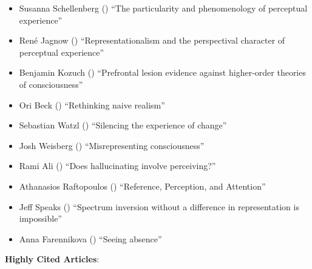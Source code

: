\documentclass[
  10pt,
  letterpaper,
  DIV=11,
  numbers=noendperiod,
  twoside]{scrartcl}
\providecommand{\tightlist}{%
  \setlength{\itemsep}{0pt}\setlength{\parskip}{0pt}}\usepackage{longtable,booktabs,array}
\begin{document}
\begin{itemize}
\tightlist
\item
  Susanna Schellenberg () ``The
  particularity and phenomenology of perceptual experience''
\item
  René Jagnow ()
  ``Representationalism and the perspectival character of perceptual
  experience''
\item
  Benjamin Kozuch () ``Prefrontal
  lesion evidence against higher-order theories of consciousness''
\item
  Ori Beck () ``Rethinking naive
  realism''
\item
  Sebastian Watzl () ``Silencing
  the experience of change''
\item
  Josh Weisberg ()
  ``Misrepresenting consciousness''
\item
  Rami Ali () ``Does
  hallucinating involve perceiving?''
\item
  Athanasios Raftopoulos ()
  ``Reference, Perception, and Attention''
\item
  Jeff Speaks () ``Spectrum
  inversion without a difference in representation is impossible''
\item
  Anna Farennikova () ``Seeing
  absence''
\end{itemize}

\textbf{Highly Cited Articles}:
\end{document}
